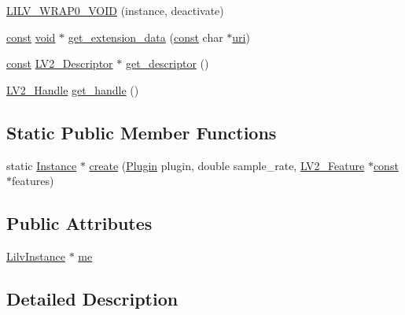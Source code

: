 \begin{DoxyCompactItemize}
\item 
\hyperlink{struct_lilv_1_1_instance_a9276d58a6f8c70e787e23fc2aa96188a}{L\+I\+L\+V\+\_\+\+W\+R\+A\+P0\+\_\+\+V\+O\+ID} (instance, deactivate)
\item 
\hyperlink{getopt1_8c_a2c212835823e3c54a8ab6d95c652660e}{const} \hyperlink{sound_8c_ae35f5844602719cf66324f4de2a658b3}{void} $\ast$ \hyperlink{struct_lilv_1_1_instance_ae842e979897703364c9aa063cf3acb40}{get\+\_\+extension\+\_\+data} (\hyperlink{getopt1_8c_a2c212835823e3c54a8ab6d95c652660e}{const} char $\ast$\hyperlink{lib_2expat_8h_a5a9fdd6c2606370ad12f24c078ac6585}{uri})
\item 
\hyperlink{getopt1_8c_a2c212835823e3c54a8ab6d95c652660e}{const} \hyperlink{lv2_8h_ac9db79f137f126ef10ef707b6de85a78}{L\+V2\+\_\+\+Descriptor} $\ast$ \hyperlink{struct_lilv_1_1_instance_a3aac989ba1509b0d7a52424939d1881b}{get\+\_\+descriptor} ()
\item 
\hyperlink{lv2_8h_a95eafb0a5290f30bcdc8c0f8eb992eaf}{L\+V2\+\_\+\+Handle} \hyperlink{struct_lilv_1_1_instance_a0bd61cb10748a368795da46d3c65ea4d}{get\+\_\+handle} ()
\end{DoxyCompactItemize}
\subsection*{Static Public Member Functions}
\begin{DoxyCompactItemize}
\item 
static \hyperlink{struct_lilv_1_1_instance}{Instance} $\ast$ \hyperlink{struct_lilv_1_1_instance_a0d82c04f46e230fe1baa3deaaddfd888}{create} (\hyperlink{struct_lilv_1_1_plugin}{Plugin} plugin, double sample\+\_\+rate, \hyperlink{lv2_8h_a78d13b607443404459db283371723234}{L\+V2\+\_\+\+Feature} $\ast$\hyperlink{getopt1_8c_a2c212835823e3c54a8ab6d95c652660e}{const} $\ast$features)
\end{DoxyCompactItemize}
\subsection*{Public Attributes}
\begin{DoxyCompactItemize}
\item 
\hyperlink{lilv_8h_acdb0d241e2506a6f59bd2d8dd427b99c}{Lilv\+Instance} $\ast$ \hyperlink{struct_lilv_1_1_instance_ab23d79de5154aa6bb92261b279a6cf7e}{me}
\end{DoxyCompactItemize}


\subsection{Detailed Description}


